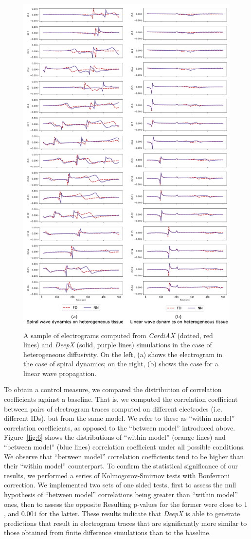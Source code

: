 \documentclass[utf8]{frontiersSCNS} %
\begin{document}
\begin{figure}[!htp]
\centering
\includegraphics[width=.73\textwidth]{Figure-7.png}
\caption{A sample of electrograms computed from \textit{CardiAX} (dotted, red lines) and \textit{DeepX} (solid, purple lines) simulations in the case of heterogeneous diffusivity. On the left, (a) shows the electrogram in the case of spiral dynamics; on the right, (b) shows the case for a linear wave propagation.
}
\label{fig:7}
\end{figure}

To obtain a control measure, we compared the distribution of correlation coefficients against a baseline.
That is, we computed the correlation coefficient between pairs of electrogram traces computed on different electrodes (i.e. different IDs), but from the same model.
We refer to these as ``within model'' correlation coefficients, as opposed to the ``between model'' introduced above.
Figure~\ref{fig:6} shows the distributions of ``within model'' (orange lines) and ``between model'' (blue lines) correlation coefficient under all possible conditions. 
We observe that ``between model'' correlation coefficients tend to be higher than their ``within model'' counterpart.
%
To confirm the statistical significance of our results, we performed a series of Kolmogorov-Smirnov tests with Bonferroni correction. 
We implemented two sets of one sided tests, first to assess the null hypothesis of ``between model'' correlations being greater than ``within model'' ones, then to assess the opposite 
Resulting p-values for the former were close to $1$, and $0.001$ for the latter. These results indicate that \textit{DeepX} is able to generate predictions that result in electrogram traces that are significantly more similar to those obtained from finite difference simulations than to the baseline.
\end{document}
